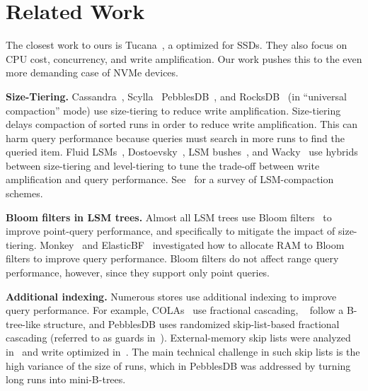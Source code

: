 \section{Related Work}
\label{sec:related}

The closest work to ours is Tucana~\cite{DBLP:conf/usenix/PapagiannisSGB16}, a
\bet optimized for SSDs.  They also focus on CPU cost, concurrency, and write
amplification.  Our work pushes this to the even more demanding case of NVMe
devices.  

\textbf{Size-Tiering.}  Cassandra~\cite{cassandra}, Scylla~\cite{scylla}
PebblesDB~\cite{DBLP:conf/sosp/RajuKCA17}, and
RocksDB~\cite{facebook-rocksdb2018} (in ``universal compaction'' mode) use
size-tiering to reduce write amplification.  Size-tiering delays compaction of
sorted runs in order to reduce write amplification.  This can harm query
performance because queries must search in more runs to find the queried item.
Fluid LSMs~\cite{DBLP:conf/sigmod/DayanI18},
Dostoevsky~\cite{DBLP:conf/sigmod/DayanI18}, LSM
bushes~\cite{DBLP:conf/sigmod/DayanI19}, and
Wacky~\cite{DBLP:conf/sigmod/DayanI19} use hybrids between size-tiering and
level-tiering to tune the trade-off between write amplification and query
performance.  See~\cite{DBLP:conf/sosp/RajuKCA17} for a survey of
LSM-compaction schemes.

\textbf{Bloom filters in LSM trees.}  Almost all LSM trees use Bloom
filters~\cite{DBLP:journals/cacm/Bloom70} to improve point-query performance,
and specifically to mitigate the impact of size-tiering.
Monkey~\cite{DBLP:conf/sigmod/DayanAI17} and
ElasticBF~\cite{DBLP:conf/usenix/LiTGLX19} investigated how to allocate RAM to
Bloom filters to improve query performance.  Bloom filters do not affect range
query performance, however, since they support only point queries.

\textbf{Additional indexing.}  Numerous \kv stores use additional indexing to
improve query performance.  For example,
COLAs~\cite{DBLP:conf/spaa/BenderFFFKN07} use fractional cascading,
\bets~\cite{DBLP:conf/soda/BrodalF03} follow a B-tree-like structure, and
PebblesDB uses randomized skip-list-based fractional cascading (referred to as
guards in~\cite{DBLP:conf/sosp/RajuKCA17}).  External-memory skip lists were
analyzed in~\cite{DBLP:conf/pods/BenderBJKMPSSZ16:set} and write optimized
in~\cite{DBLP:conf/pods/BenderFJMMPX17}.  The main technical challenge in such
skip lists is the high variance of the size of runs, which in PebblesDB was
addressed by turning long runs into mini-B-trees.

